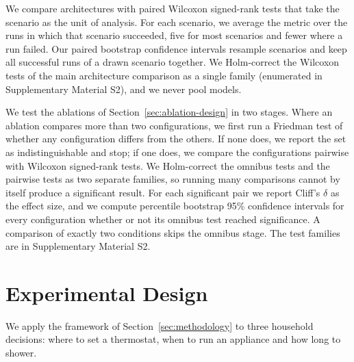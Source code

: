 \documentclass[final,3p,times]{elsarticle}
\begin{document}
We compare architectures with paired Wilcoxon signed-rank tests that take the scenario as the unit of analysis. For each scenario, we average the metric over the runs in which that scenario succeeded, five for most scenarios and fewer where a run failed. Our paired bootstrap confidence intervals resample scenarios and keep all successful runs of a drawn scenario together. We Holm-correct the Wilcoxon tests of the main architecture comparison as a single family (enumerated in Supplementary Material S2), and we never pool models.

We test the ablations of Section~\ref{sec:ablation-design} in two stages. Where an ablation compares more than two configurations, we first run a Friedman test of whether any configuration differs from the others. If none does, we report the set as indistinguishable and stop; if one does, we compare the configurations pairwise with Wilcoxon signed-rank tests. We Holm-correct the omnibus tests and the pairwise tests as two separate families, so running many comparisons cannot by itself produce a significant result. For each significant pair we report Cliff's $\delta$ as the effect size, and we compute percentile bootstrap 95\% confidence intervals for every configuration whether or not its omnibus test reached significance. A comparison of exactly two conditions skips the omnibus stage. The test families are in Supplementary Material S2.


\FloatBarrier

\section{Experimental Design}
\label{sec:experimental-design}

We apply the framework of Section~\ref{sec:methodology} to three household decisions: where to set a thermostat, when to run an appliance and how long to shower.
\end{document}
